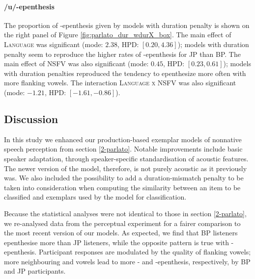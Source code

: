 \paragraph{/u/-epenthesis}
The proportion of -epenthesis given by models with duration penalty is shown on the right panel of Figure \ref{fig:parlato_dur_wdurX_box}.
The main effect of \textsc{Language} was significant (mode: $2.38$, HPD: $[0.20, 4.36]$); models with duration penalty seem to reproduce the higher rates of -epenthesis for JP than BP.
The main effect of \textsc{NSFV} was also significant (mode: $0.45$, HPD: $[0.23, 0.61]$); models with duration penalties reproduced the tendency to epenthesize  more often with more  flanking vowels.
The interaction \textsc{Language x NSFV} was also significant (mode: $-1.21$, HPD: $[-1.61, -0.86]$).

\subsection{Discussion}

In this study we enhanced our production-based exemplar models of nonnative speech perception from section \ref{2-parlato}. Notable improvements include basic speaker adaptation, through speaker-specific standardisation of acoustic features. The newer version of the model, therefore, is not purely acoustic as it previously was. We also included the possibility to add a duration-mismatch penalty to be taken into consideration when computing the similarity between an item to be classified and exemplars used by the model for classification.

Because the statistical analyses were not identical to those in section \ref{2-parlato}, we re-analysed data from the perceptual experiment for a fairer comparison to the most recent version of our models. As expected, we find that BP listeners epenthesise more  than JP listeners, while the opposite pattern is true with -epenthesis. Participant responses are modulated by the quality of flanking vowels; more neighbouring  and  vowels lead to more - and -epenthesis, respectively, by BP and JP participants.


